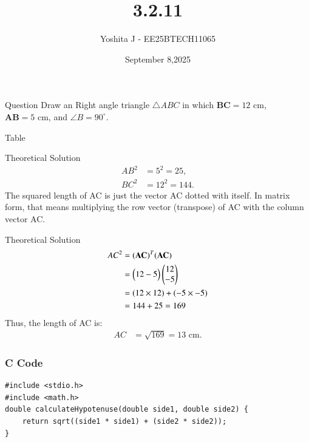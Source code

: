 \documentclass{beamer}
\begin{document}
\title 
{3.2.11}
\date{September 8,2025}


\author 
{Yoshita J - EE25BTECH11065}






\frame{\titlepage}
\begin{frame}{Question}
 Draw an Right angle  triangle $\triangle ABC$ in which $\boldsymbol{BC} = 12 \text{ cm}$, $\boldsymbol{AB} = 5 \text{ cm}$, and $\angle B = 90^\circ$.

\end{frame}



\begin{frame}{Table}
    \begin{table}[h!]    
      \centering
      
      \caption{}
    \end{table}
\end{frame}
\begin{frame}{Theoretical Solution}
\begin{align}
      AB^2 & = 5^2 = 25, \\
      BC^2 & = 12^2 = 144.
   \end{align}
  The squared length of AC is just the vector AC dotted with itself. In matrix form, that means multiplying the row vector (transpose) of AC with the column vector AC.
\end{frame}

\begin{frame}{Theoretical Solution}
\begin{align}
    AC^2 &= (\mathbf{AC})^T (\mathbf{AC}) \\
         &= \begin{pmatrix}12 -5\end{pmatrix} \begin{pmatrix}12 \\ -5\end{pmatrix} \\
         &= (12 \times 12) + (-5 \times -5) \\
         &= 144 + 25 = 169
\end{align}
Thus, the length of AC is:
\begin{align}
    AC &= \sqrt{169} = 13 \text{ cm}.
\end{align}

\end{frame}


\begin{frame}[fragile]
    \frametitle{C Code}

    \begin{lstlisting}
#include <stdio.h>
#include <math.h> 
double calculateHypotenuse(double side1, double side2) {
    return sqrt((side1 * side1) + (side2 * side2));
}

    \end{lstlisting}
\end{frame}
\end{document}
